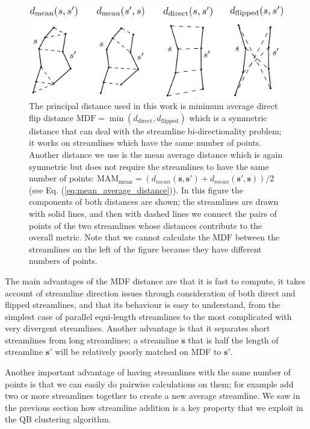 \documentclass{bioinfo}
\begin{document}
\begin{methods}
\begin{figure}
\includegraphics[scale=0.35]{Figures/Fig_2_distances2}
\centering{}
\caption{The principal distance used in this work is minimum average
  direct flip distance
  $\textrm{MDF}=\min(d_{\textrm{direct}},d_{\textrm{flipped}})$ which is
  a symmetric distance that can deal with the streamline
  bi-directionality problem; it works on streamlines which have the same
  number of points.  Another distance we use is the mean average
  distance which is again symmetric but does not require the streamlines
  to have the same number of points:
  $\textrm{MAM}_{\textrm{mean}}=(d_{mean}(\mathbf{s},\mathbf{s'})+d_{mean}(\mathbf{s'},\mathbf{s}))/2$
  (see Eq.  (\ref{eq:mean_average_distance})).  In this figure the
  components of both distances are shown; the streamlines are drawn with
  solid lines, and then with dashed lines we connect the pairs of points
  of the two streamlines whose distances contribute to the overall
  metric. Note that we cannot calculate the $\textrm{MDF}$ between the
  streamlines on the left of the figure because they have different
  numbers of points.
\label{Flo:Distances_used}}
\end{figure}

The main advantages of the MDF distance are that it is fast to compute,
it takes account of streamline direction issues through consideration of
both direct and flipped streamlines, and that its behaviour is easy to
understand, from the simplest case of parallel equi-length streamlines
to the most complicated with very divergent streamlines. Another
advantage is that it separates short streamlines from long streamlines;
a streamline $\mathbf{s}$ that is half the length of streamline
$\mathbf{s'}$ will be relatively poorly matched on MDF to $\mathbf{s'}$.

Another important advantage of having streamlines with the same number
of points is that we can easily do pairwise calculations on them; for
example add two or more streamlines together to create a new average
streamline. We saw in the previous section how streamline addition is a
key property that we exploit in the QB clustering algorithm.


\end{methods}
\end{document}
